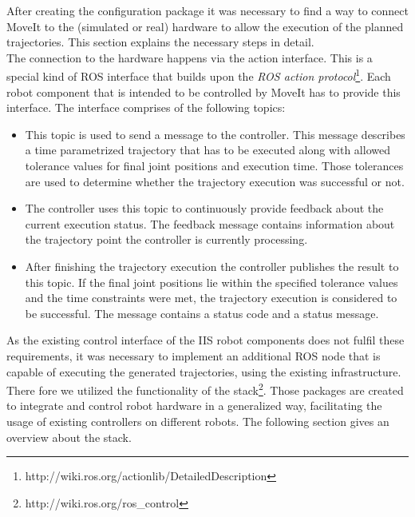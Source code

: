 After creating the configuration package it was necessary to find a way to connect MoveIt to the (simulated or real) hardware to allow the execution of the planned trajectories. This section explains the necessary steps in detail. \\

The connection to the hardware happens via the  action interface. This is a special kind of ROS interface that builds upon the \emph{ROS action protocol}\footnote{http://wiki.ros.org/actionlib/DetailedDescription}. Each robot component that is intended to be controlled by MoveIt has to provide this interface. The interface comprises of the following topics:
\begin{itemize}

\item {}

This topic is used to send a  message to the controller. This message describes a time parametrized trajectory that has to be executed along with allowed tolerance values for final joint positions and execution time. Those tolerances are used to determine whether the trajectory execution was successful or not.

\item {}

The controller uses this topic to continuously provide feedback about the current execution status. The feedback message contains information about the trajectory point the controller is currently processing.

\item {}

After finishing the trajectory execution the controller publishes the result to this topic. If the final joint positions lie within the specified tolerance values and the time constraints were met, the trajectory execution is considered to be successful. The message contains a status code and a status message.

\end{itemize}
As the existing control interface of the IIS robot components does not fulfil these requirements, it was necessary to implement an additional ROS node that is capable of executing the generated trajectories, using the existing infrastructure. There fore we utilized the functionality of the  stack\footnote{http://wiki.ros.org/ros\_control}. Those packages are created to integrate and control robot hardware in a generalized way, facilitating the usage of existing controllers on different robots. The following section gives an overview about the  stack.

